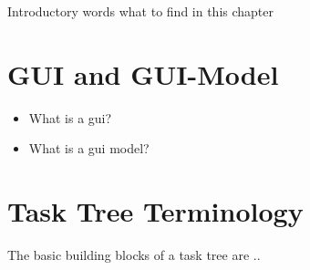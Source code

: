 Introductory words what to find in this chapter

\section{GUI and GUI-Model}
\label{sec:foundationguiandguimodel}
\begin{itemize}
	\item What is a gui?
	\item What is a gui model?
\end{itemize}

\section{Task Tree Terminology}
\label{sec:foundationtasktreeterminology}
	The basic building blocks of a task tree are ..
